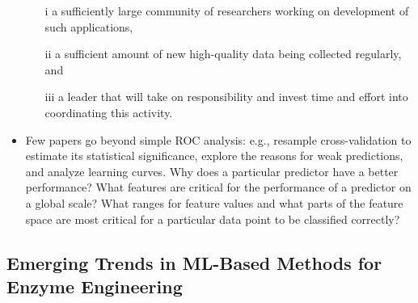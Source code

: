 \documentclass[12pt]{article}
\begin{document}
\begin{itemize}
\begin{itemize}
\item[i] a sufficiently large community of researchers working on development of such applications, 
\item[ii] a sufficient amount of new high-quality data being collected regularly, and 
\item[iii] a leader that will take on responsibility and invest time and eﬀort into coordinating this activity. 
\end{itemize}

\item Few papers go beyond simple ROC analysis: e.g., resample cross-validation to estimate its statistical signiﬁcance, explore the reasons for weak predictions, and analyze learning curves. Why does a particular predictor have a better performance? What features are critical for the performance of a predictor on a global scale? What ranges for feature values and what parts of the feature space are most critical for a particular data point to be classiﬁed correctly?

\end{itemize}

\subsection{Emerging Trends in ML-Based Methods for Enzyme Engineering}
\end{document}
